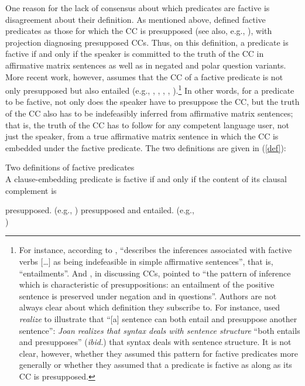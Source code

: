\documentclass[11pt,fleqn]{article}
\newcommand{\6}{\mbox{$[\hspace*{-.6mm}[$}}
\newcommand{\9}{\mbox{$]\hspace*{-.6mm}]$}}
\begin{document}
One reason for the lack of consensus about which predicates are factive is disagreement about their definition. As mentioned above, \citealt{kiparsky-kiparsky70} defined factive predicates as those for which the CC is presupposed (see also, e.g., \citealt{karttunen71-implicative,karttunen71b}), with projection diagnosing presupposed CCs. Thus, on this definition, a predicate is factive if and only if the speaker is committed to the truth of the CC in affirmative matrix sentences as well as in negated and polar question variants. More recent work, however, assumes that the CC of a factive predicate is not only presupposed but also entailed (e.g., \citealt[119-123]{gazdar79a}, \citealt[139]{schlenker10}, \citealt{abrusan2011}, \citealt[71]{anand-hacquard2014}, \citealt[fn.7]{spector-egre2015}).\footnote{For instance, according to \citet[66f.]{beaver01}, \citet[119-123]{gazdar79a} ``describes the inferences associated with factive verbs $[$\dots$]$ as being indefeasible in simple affirmative sentences'', that is, ``entailments''. And \citet[139]{schlenker10}, in discussing CCs, pointed to ``the pattern of inference which is characteristic of presuppositions: an entailment of the positive sentence is preserved under negation and in questions''. Authors are not always clear about which definition they subscribe to. For instance, \citet[355]{ccmg90} used {\em realize} to illustrate that ``[a] sentence can both entail and presuppose another sentence'': {\em Joan realizes that syntax deals with sentence structure} ``both entails and presupposes''  ({\em ibid.}) that syntax deals with sentence structure. It is not clear, however, whether they assumed this pattern for factive predicates more generally or whether they assumed that a predicate is factive as along as its CC is presupposed.} In other words, for a predicate to be factive, not only does the speaker have to presuppose the CC, but the truth of the CC also has to be indefeasibly inferred from affirmative matrix sentences; that is, the truth of the CC has to follow for any competent language user, not just the speaker, from a true affirmative matrix sentence in which the CC is embedded under the factive predicate. The two definitions are given in (\ref{def}):

\begin{exe}
\ex\label{def} Two definitions of factive predicates \\ A clause-embedding predicate is factive if and only if the content of its clausal complement is 
\begin{xlist}
\ex presupposed. \hfill (e.g., \citealt{kiparsky-kiparsky70,karttunen71-implicative,karttunen71b})
\ex presupposed and entailed.  \hfill (e.g., \citealt{gazdar79a,schlenker10,abrusan2011}\\\hspace*{.2cm}\hfill \citealt{anand-hacquard2014,spector-egre2015})
\end{xlist}
\end{exe}
\end{document}
